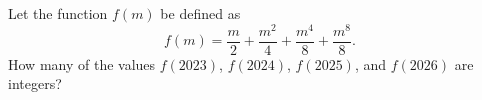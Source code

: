 Let the function $f(m)$ be defined as \[f(m)=\dfrac{m}{2}+\dfrac{m^{2}}{4}+\dfrac{m^{4}}{8}+\dfrac{m^{8}}{8}.\]How many of the values $f(2023)$, $f(2024)$, $f(2025)$, and $f(2026)$ are integers?
